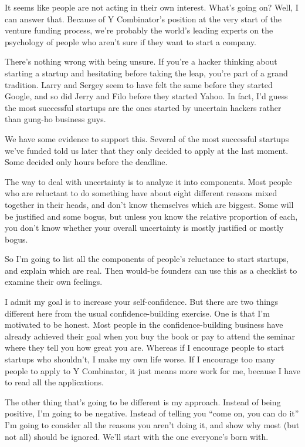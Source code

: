 It seems like people are not acting in their own interest. What's going
on? Well, I can answer that. Because of Y Combinator's position at the
very start of the venture funding process, we're probably the world's
leading experts on the psychology of people who aren't sure if they want
to start a company.

There's nothing wrong with being unsure. If you're a hacker thinking
about starting a startup and hesitating before taking the leap, you're
part of a grand tradition. Larry and Sergey seem to have felt the same
before they started Google, and so did Jerry and Filo before they
started Yahoo. In fact, I'd guess the most successful startups are the
ones started by uncertain hackers rather than gung-ho business guys.

We have some evidence to support this. Several of the most successful
startups we've funded told us later that they only decided to apply at
the last moment. Some decided only hours before the deadline.

The way to deal with uncertainty is to analyze it into components. Most
people who are reluctant to do something have about eight different
reasons mixed together in their heads, and don't know themselves which
are biggest. Some will be justified and some bogus, but unless you know
the relative proportion of each, you don't know whether your overall
uncertainty is mostly justified or mostly bogus.

So I'm going to list all the components of people's reluctance to start
startups, and explain which are real. Then would-be founders can use
this as a checklist to examine their own feelings.

I admit my goal is to increase your self-confidence. But there are two
things different here from the usual confidence-building exercise. One
is that I'm motivated to be honest. Most people in the
confidence-building business have already achieved their goal when you
buy the book or pay to attend the seminar where they tell you how great
you are. Whereas if I encourage people to start startups who shouldn't,
I make my own life worse. If I encourage too many people to apply to Y
Combinator, it just means more work for me, because I have to read all
the applications.

The other thing that's going to be different is my approach. Instead of
being positive, I'm going to be negative. Instead of telling you ``come
on, you can do it'' I'm going to consider all the reasons you aren't
doing it, and show why most (but not all) should be ignored. We'll start
with the one everyone's born with.

